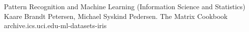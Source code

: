 \begin{thebibliography}{99}
    Pattern Recognition and Machine Learning (Information Science and Statistics)
    Kaare Brandt Petersen, Michael Syskind Pedersen. The Matrix Cookbook
    archive.ics.uci.edu-ml-datasets-iris
\end{thebibliography}
